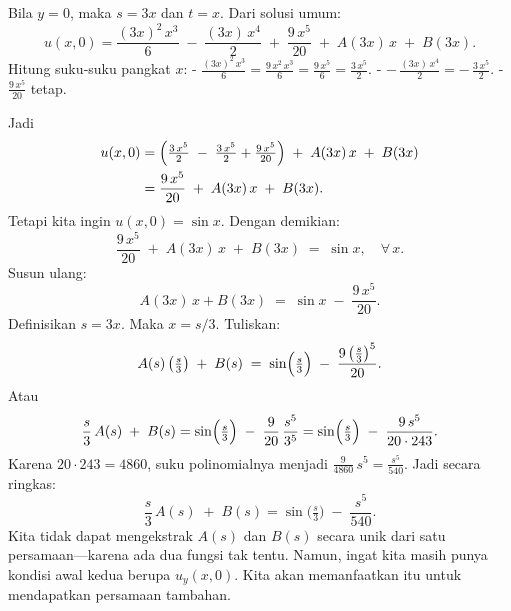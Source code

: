 \documentclass[a4paper]{article}
\theoremstyle{definition}
\begin{document}
\begin{enumerate}
\begin{enumerate}
   Bila \(y=0\), maka \(s = 3x\) dan \(t = x\). Dari solusi umum:
   \[
   u(x,0)
   = \frac{(3x)^{2}\,x^{3}}{6}
     \;-\;\frac{(3x)\,x^{4}}{2}
     \;+\;\frac{9\,x^{5}}{20}
     \;+\;A(3x)\,x
     \;+\;B(3x).
   \]
   Hitung suku‐suku pangkat \(x\):
   - \(\displaystyle \frac{(3x)^{2}\,x^{3}}{6} 
     = \frac{9\,x^{2}\,x^{3}}{6} 
     = \frac{9\,x^{5}}{6} 
     = \frac{3\,x^{5}}{2}.\)
   - \(\displaystyle -\,\frac{(3x)\,x^{4}}{2} 
     = -\,\frac{3\,x^{5}}{2}.\)
   - \(\displaystyle \frac{9\,x^{5}}{20}\) tetap.

   Jadi
   \[
   \begin{aligned}
   u(x,0)
   &= \Bigl(\tfrac{3\,x^{5}}{2}\;-\;\tfrac{3\,x^{5}}{2} + \tfrac{9\,x^{5}}{20}\Bigr)
     \;+\;A(3x)\,x \;+\; B(3x)\\
   &= \frac{9\,x^{5}}{20} \;+\; A(3x)\,x \;+\; B(3x).
   \end{aligned}
   \]
   Tetapi kita ingin \(u(x,0) = \sin x\). Dengan demikian:
   \[
   \frac{9\,x^{5}}{20} \;+\; A(3x)\,x \;+\; B(3x) \;=\; \sin x,
   \quad \forall\,x.
   \]
   Susun ulang:
   \[
   A(3x)\,x + B(3x) 
   \;=\; \sin x \;-\; \frac{9\,x^{5}}{20}.
   \]
   Definisikan \(s = 3x\). Maka \(x = s/3\). Tuliskan:
   \[
   A(s)\,\bigl(\tfrac{s}{3}\bigr) \;+\; B(s) 
   \;=\; \sin\Bigl(\tfrac{s}{3}\Bigr) \;-\; \frac{9\,\bigl(\tfrac{s}{3}\bigr)^{5}}{20}.
   \]
   Atau
   \[
   \frac{s}{3}\,A(s) \;+\; B(s) 
   = \sin\Bigl(\tfrac{s}{3}\Bigr)
     \;-\; \frac{9}{20}\,\frac{s^{5}}{3^{5}} 
   = \sin\Bigl(\tfrac{s}{3}\Bigr)
     \;-\; \frac{9\,s^{5}}{20 \cdot 243}.
   \]
   Karena \(20 \cdot 243 = 4860\), suku polinomialnya menjadi \(\tfrac{9}{4860}\,s^{5} = \tfrac{s^{5}}{540}\). Jadi secara ringkas:
   \[
   \frac{s}{3}\,A(s) \;+\; B(s) 
   = \sin\!\bigl(\tfrac{s}{3}\bigr) \;-\; \frac{s^{5}}{540}.
   \]
   Kita tidak dapat mengekstrak \(A(s)\) dan \(B(s)\) secara unik dari satu persamaan—karena ada dua fungsi tak tentu. Namun, ingat kita masih punya kondisi awal kedua berupa \(u_{y}(x,0)\). Kita akan memanfaatkan itu untuk mendapatkan persamaan tambahan.



\end{enumerate}
\end{enumerate}
\end{document}
